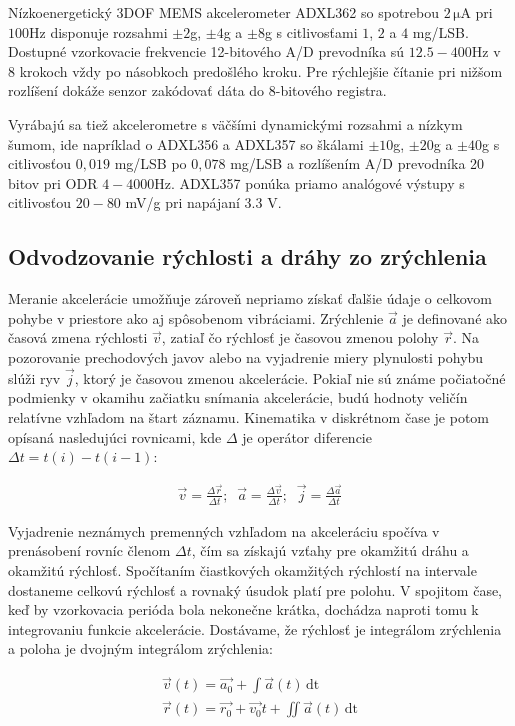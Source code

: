 Nízkoenergetický 3DOF MEMS akcelerometer ADXL362 \cite{adxl362} so spotrebou $2\,\mathrm{\mu A}$ pri $100$Hz disponuje
rozsahmi $\pm2$g, $\pm4$g a $\pm8$g s citlivosťami $1$, $2$ a $4$ mg/LSB. Dostupné vzorkovacie frekvencie 12-bitového A/D prevodníka sú
$12.5 - 400$Hz v 8 krokoch vždy po násobkoch predošlého kroku. Pre rýchlejšie čítanie pri nižšom rozlíšení dokáže senzor zakódovať dáta
do 8-bitového registra.

Vyrábajú sa tiež akcelerometre s väčšími dynamickými rozsahmi a nízkym šumom, ide napríklad o ADXL356 a ADXL357 \cite{adxl357} so
škálami $\pm 10$g, $\pm 20$g a $\pm 40$g s citlivosťou $0,019$ mg/LSB po $0,078$ mg/LSB a rozlíšením A/D prevodníka 20 bitov pri
ODR $4 - 4000$Hz. ADXL357 ponúka priamo analógové výstupy s citlivosťou $20 - 80$ mV/g pri napájaní $3.3$ V.

\subsection{Odvodzovanie rýchlosti a dráhy zo zrýchlenia}
Meranie akcelerácie umožňuje zároveň nepriamo získať ďalšie údaje o celkovom pohybe v priestore ako aj spôsobenom vibráciami.
Zrýchlenie $\vec{a}$ je definované ako časová zmena rýchlosti $\vec{v}$, zatiaľ čo rýchlosť je časovou zmenou polohy $\vec{r}$. Na
pozorovanie prechodových javov alebo na vyjadrenie miery plynulosti pohybu slúži ryv $\vec{j}$, ktorý je časovou zmenou akcelerácie.
Pokiaľ nie sú známe počiatočné podmienky v okamihu začiatku snímania akcelerácie, budú hodnoty veličín relatívne vzhľadom na
štart záznamu. Kinematika v diskrétnom čase je potom opísaná nasledujúci rovnicami, kde $\Delta$ je operátor diferencie
$\Delta t = t(i) - t(i-1)$:
\begin{ceqn}\begin{align}
   \vec{v} = \frac{\Delta \vec{r}}{\Delta t}; \;\;
   \vec{a} = \frac{\Delta \vec{v}}{\Delta t}; \;\;
   \vec{j} = \frac{\Delta \vec{a}}{\Delta t}
\end{align}\end{ceqn}

Vyjadrenie neznámych premenných vzhľadom na akceleráciu spočíva v prenásobení rovníc členom $\Delta t$, čím sa získajú
vzťahy pre okamžitú dráhu a okamžitú rýchlosť. Spočítaním čiastkových okamžitých rýchlostí na intervale dostaneme celkovú rýchlosť a
rovnaký úsudok platí pre polohu. V spojitom čase, keď by vzorkovacia perióda bola nekonečne krátka, dochádza naproti tomu k
integrovaniu funkcie akcelerácie. Dostávame, že rýchlosť je integrálom zrýchlenia a poloha je dvojným integrálom zrýchlenia:
\begin{ceqn}\begin{align}
   \vec{v}(t) = \vec{a_0} + \int{\vec{a}(t)\,\mathrm{dt}} \\
   \vec{r}(t) = \vec{r_0} + \vec{v_0}t + \iint{\vec{a}(t)\,\mathrm{dt}}
\end{align}\end{ceqn}


